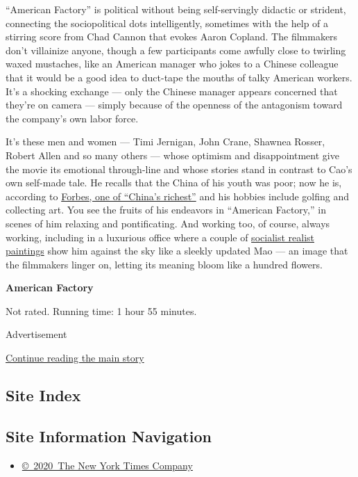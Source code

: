 ``American Factory'' is political without being self-servingly didactic
or strident, connecting the sociopolitical dots intelligently, sometimes
with the help of a stirring score from Chad Cannon that evokes Aaron
Copland. The filmmakers don't villainize anyone, though a few
participants come awfully close to twirling waxed mustaches, like an
American manager who jokes to a Chinese colleague that it would be a
good idea to duct-tape the mouths of talky American workers. It's a
shocking exchange --- only the Chinese manager appears concerned that
they're on camera --- simply because of the openness of the antagonism
toward the company's own labor force.

It's these men and women --- Timi Jernigan, John Crane, Shawnea Rosser,
Robert Allen and so many others --- whose optimism and disappointment
give the movie its emotional through-line and whose stories stand in
contrast to Cao's own self-made tale. He recalls that the China of his
youth was poor; now he is, according to
\href{https://www.forbes.com/profile/cho-tak-wong/\#5f04e25416cc}{Forbes,
one of ``China's richest''} and his hobbies include golfing and
collecting art. You see the fruits of his endeavors in ``American
Factory,'' in scenes of him relaxing and pontificating. And working too,
of course, always working, including in a luxurious office where a
couple of
\href{https://www.nytimes.com/2008/09/05/arts/design/05revo.html}{socialist
realist paintings} show him against the sky like a sleekly updated Mao
--- an image that the filmmakers linger on, letting its meaning bloom
like a hundred flowers.

\textbf{American Factory}

Not rated. Running time: 1 hour 55 minutes.

Advertisement

\protect\hyperlink{after-bottom}{Continue reading the main story}

\hypertarget{site-index}{%
\subsection{Site Index}\label{site-index}}

\hypertarget{site-information-navigation}{%
\subsection{Site Information
Navigation}\label{site-information-navigation}}

\begin{itemize}
\tightlist
\item
  \href{https://help.nytimes.com/hc/en-us/articles/115014792127-Copyright-notice}{©~2020~The
  New York Times Company}
\end{itemize}

